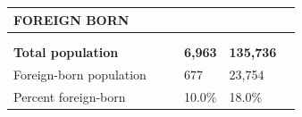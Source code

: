 \documentclass[9pt]{report}
\begin{document}
\newpage
\setlength{\tabcolsep}{.01in} %
\begin{tabular}{p{.10in}p{.10in}p{.10in}p{3.7in}>{\hfill}p{.85in}>{\hfill}p{.85in}>{\hfill}p{.85in}>{\hfill}p{.85in}p{0.1in}}
\multicolumn{9}{l}{\parbox{7.1in}{\raggedright{\large{\strut\textbf{FOREIGN BORN}\strut}}}} \\ 
\hline
\multicolumn{4}{l}{\parbox{3.5in}{\raggedright{\textbf{}}}} & \multicolumn{1}{r}{\parbox{.85in}{\strut\raggedleft{\textbf{}\strut}}} & \multicolumn{1}{r}{\parbox{.85in}{\strut\raggedleft{\textbf{}\strut}}} & \multicolumn{1}{r}{\parbox{.85in}{\strut{}}} & \multicolumn{1}{r}{\parbox{.85in}{\strut{}}} & \\ 
\multicolumn{9}{l}{} \\ 
\multicolumn{4}{l}{\parbox{3.5in}{\strut\raggedright{\textbf{Total population}\strut}}} & \textbf{} & \textbf{} & \textbf{6,963} & \textbf{135,736} & \textbf{} \\ 
\multicolumn{4}{l}{\parbox{3.6in}{\strut\raggedright{{Foreign-born population}}\strut}} &  &  & 677 & 23,754 & \multicolumn{1}{l}{}  \\ 
\multicolumn{4}{l}{\parbox{3.6in}{\strut\raggedright{{Percent foreign-born}}\strut}} &  &  & 10.0\% & 18.0\% & \multicolumn{1}{l}{}  \\ 

\end{tabular}
\setlength{\tabcolsep}{6pt} %
\end{document}
